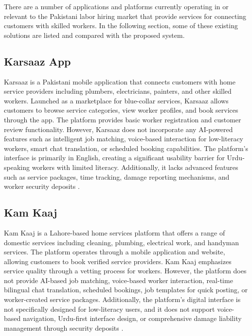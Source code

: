 \documentclass[12pt,a4paper]{report}
\begin{document}
There are a number of applications and platforms currently operating in or
relevant to the Pakistani labor hiring market that provide services for
connecting customers with skilled workers. In the following section, some of
these existing solutions are listed and compared with the proposed system.

\subsection{Karsaaz App}
Karsaaz is a Pakistani mobile application that connects customers with home
service providers including plumbers, electricians, painters, and other skilled
workers. Launched as a marketplace for blue-collar services, Karsaaz allows
customers to browse service categories, view worker profiles, and book services
through the app. The platform provides basic worker registration and customer
review functionality. However, Karsaaz does not incorporate any AI-powered
features such as intelligent job matching, voice-based interaction for
low-literacy workers, smart chat translation, or scheduled booking capabilities.
The platform's interface is primarily in English, creating a significant
usability barrier for Urdu-speaking workers with limited literacy. Additionally,
it lacks advanced features such as service packages, time tracking, damage
reporting mechanisms, and worker security deposits \cite{karsaaz}.

\subsection{Kam Kaaj}
Kam Kaaj is a Lahore-based home services platform that offers a range of
domestic services including cleaning, plumbing, electrical work, and handyman
services. The platform operates through a mobile application and website,
allowing customers to book verified service providers. Kam Kaaj emphasizes
service quality through a vetting process for workers. However, the platform
does not provide AI-based job matching, voice-based worker interaction,
real-time bilingual chat translation, scheduled bookings, job templates for
quick posting, or worker-created service packages. Additionally, the platform's
digital interface is not specifically designed for low-literacy users, and it
does not support voice-based navigation, Urdu-first interface design, or
comprehensive damage liability management through security deposits
\cite{kamkaaj}.
\end{document}
